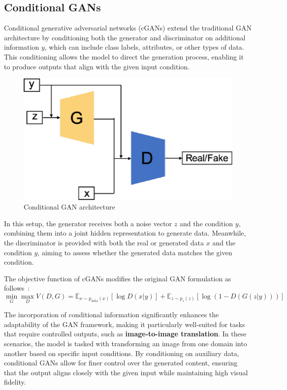 \documentclass[12pt,DIV14,BCOR12mm,a4paper,footinclude=false,headinclude,parskip=half-,twoside,openright,cleardoublepage=empty,toc=index,bibliography=totoc,listof=totoc]{scrreprt}
\numberwithin{equation}{chapter}
\begin{document}
\subsection{Conditional GANs}
Conditional generative adversarial networks (cGANs) extend the traditional GAN architecture by conditioning both the generator and discriminator on additional information \( y \), which can include class labels, attributes, or other types of data. This conditioning allows the model to direct the generation process, enabling it to produce outputs that align with the given input condition. 
\begin{figure}
	\centering
	\includegraphics[scale=.9]{../media/Conditional-GAN-architecture.png}
	\caption{Conditional GAN architecture~\cite{eckerli2106generative}}
	\label{cGAN}
\end{figure}
In this setup, the generator receives both a noise vector \( z \) and the condition \( y \), combining them into a joint hidden representation to generate data. Meanwhile, the discriminator is provided with both the real or generated data \( x \) and the condition \( y \), aiming to assess whether the generated data matches the given condition.

The objective function of cGANs modifies the original GAN formulation as follows~\cite{gauthier2014conditional}:
\begin{equation}
\min_{G} \max_{D} V(D, G) = \mathbb{E}_{x \sim p_{\text{data}}(x)} [\log D(x|y)] + \mathbb{E}_{z \sim p_z(z)} [\log(1 - D(G(z|y)))]
\end{equation}

The incorporation of conditional information significantly enhances the adaptability of the GAN framework, making it particularly well-suited for tasks that require controlled outputs, such as \textbf{image-to-image translation}. In these scenarios, the model is tasked with transforming an image from one domain into another based on specific input conditions. By conditioning on auxiliary data, conditional GANs allow for finer control over the generated content, ensuring that the output aligns closely with the given input while maintaining high visual fidelity.
\end{document}
